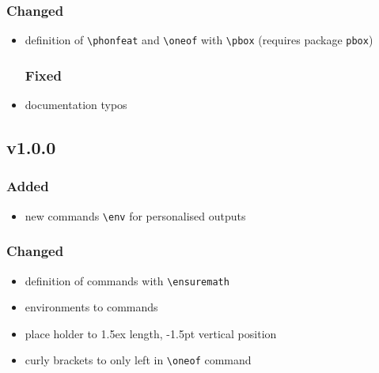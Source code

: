 \documentclass[a4paper]{article}
\begin{document}
\subsubsection*{Changed}
\begin{itemize}
\item definition of \verb+\phonfeat+ and \verb+\oneof+ with \verb+\pbox+ (requires package \texttt{pbox})
\subsubsection*{Fixed}
\item documentation typos
\end{itemize}

\subsection*{v1.0.0}
\subsubsection*{Added}
\begin{itemize}
\item new commands \verb|\env| for personalised outputs
\end{itemize}

\subsubsection*{Changed}
\begin{itemize}
\item definition of commands with \verb|\ensuremath|
\item environments to commands
\item place holder to 1.5ex length, -1.5pt vertical position
\item curly brackets to only left in \verb|\oneof| command
\end{itemize}
\end{document}
